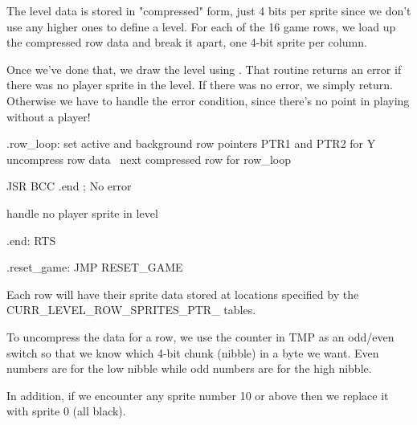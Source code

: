 \documentclass[10pt]{report}%
\begin{document}
The level data is stored in "compressed" form, just 4 bits per sprite since we
don't use any higher ones to define a level. For each of the 16 game rows,
we load up the compressed row data and break it apart, one 4-bit sprite per
column.

Once we've done that, we draw the level using {\Tt{}\nwendquote}. That
routine returns an error if there was no player sprite in the level. If
there was no error, we simply return. Otherwise we have to handle the
error condition, since there's no point in playing without a player!

\nwenddocs{}\endmoddef\nwstartdeflinemarkup{}\nwenddeflinemarkup
.row_loop:
    \LA{}set active and background row pointers \code{}PTR1\edoc{} and \code{}PTR2\edoc{} for \code{}Y\edoc{}~{\nwtagstyle{}}\RA{}
    \LA{}uncompress row data~{\nwtagstyle{}}\RA{}
    \LA{}next compressed row for \code{}row{\_}loop\edoc{}~{\nwtagstyle{}}\RA{}

    JSR     
    BCC     .end                ; No error

\LA{}handle no player sprite in level~{\nwtagstyle{}}\RA{}

.end:
    RTS

.reset_game:
    JMP     RESET_GAME
\nwendcode{}\nwdocspar

Each row will have their sprite data stored at locations specified by
the {\Tt{}CURR{\_}LEVEL{\_}ROW{\_}SPRITES{\_}PTR{\_}\nwendquote} tables.

To uncompress the data for a row, we use the counter in {\Tt{}TMP\nwendquote} as an odd/even
switch so that we know which 4-bit chunk (nibble) in a byte we want. Even
numbers are for the low nibble while odd numbers are for the high nibble.

In addition, if we encounter any sprite number 10 or above then we replace it with
sprite 0 (all black).
\end{document}
